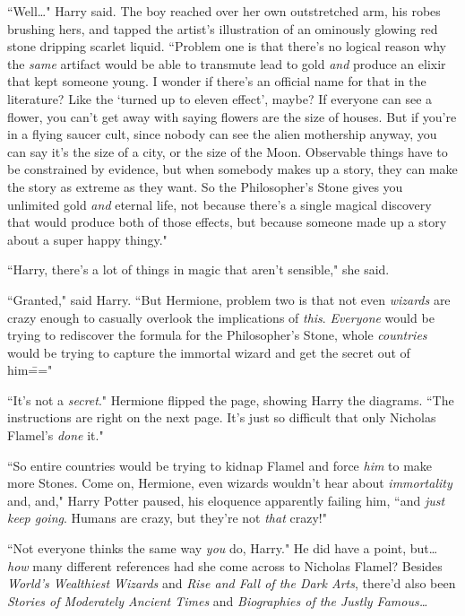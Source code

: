 ``Well{\ldots}" Harry said. The boy reached over her own outstretched arm, his robes brushing hers, and tapped the artist's illustration of an ominously glowing red stone dripping scarlet liquid. ``Problem one is that there's no logical reason why the \emph{same} artifact would be able to transmute lead to gold \emph{and} produce an elixir that kept someone young. I wonder if there's an official name for that in the literature? Like the `turned up to eleven effect', maybe? If everyone can see a flower, you can't get away with saying flowers are the size of houses. But if you're in a flying saucer cult, since nobody can see the alien mothership anyway, you can say it's the size of a city, or the size of the Moon. Observable things have to be constrained by evidence, but when somebody makes up a story, they can make the story as extreme as they want. So the Philosopher's Stone gives you unlimited gold \emph{and} eternal life, not because there's a single magical discovery that would produce both of those effects, but because someone made up a story about a super happy thingy."

``Harry, there's a lot of things in magic that aren't sensible," she said.

``Granted," said Harry. ``But Hermione, problem two is that not even \emph{wizards} are crazy enough to casually overlook the implications of \emph{this}. \emph{Everyone} would be trying to rediscover the formula for the Philosopher's Stone, whole \emph{countries} would be trying to capture the immortal wizard and get the secret out of him\==="

``It's not a \emph{secret}." Hermione flipped the page, showing Harry the diagrams. ``The instructions are right on the next page. It's just so difficult that only Nicholas Flamel's \emph{done} it."

``So entire countries would be trying to kidnap Flamel and force \emph{him} to make more Stones. Come on, Hermione, even wizards wouldn't hear about \emph{immortality} and, and," Harry Potter paused, his eloquence apparently failing him, ``and \emph{just keep going}. Humans are crazy, but they're not \emph{that} crazy!"

``Not everyone thinks the same way \emph{you} do, Harry." He did have a point, but{\ldots} \emph{how} many different references had she come across to Nicholas Flamel? Besides \emph{World's Wealthiest Wizards} and \emph{Rise and Fall of the Dark Arts}, there'd also been \emph{Stories of Moderately Ancient Times} and \emph{Biographies of the Justly Famous{\ldots}}

